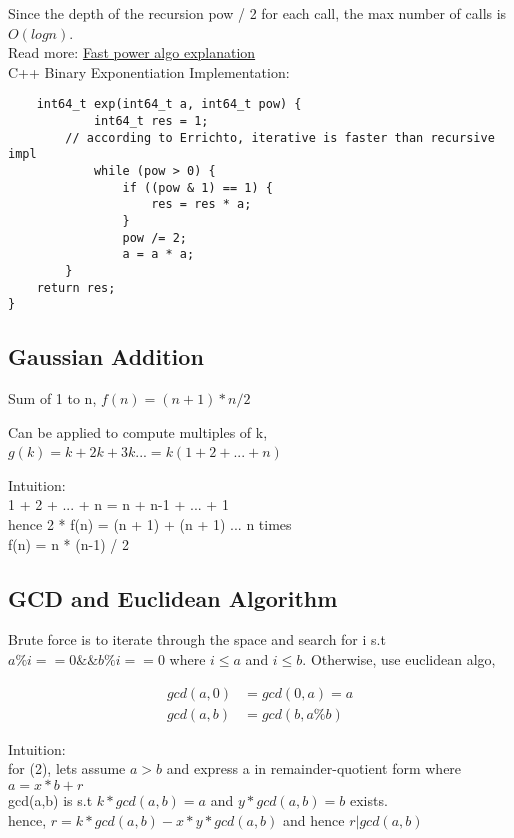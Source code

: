 \documentclass[12pt]{article}
\begin{document}
Since the depth of the recursion pow / 2 for each call, the max number of calls is \(O(log n)\). \\ [\baselineskip]

\noindent Read more: \href{https://www.rookieslab.com/posts/fast-power-algorithm-exponentiation-by-squaring-cpp-python-implementation}{Fast power algo explanation} \\ [\baselineskip]

\noindent C++ Binary Exponentiation Implementation:
\begin{verbatim}
	int64_t exp(int64_t a, int64_t pow) {
    		int64_t res = 1; 
		// according to Errichto, iterative is faster than recursive impl
    		while (pow > 0) {
        		if ((pow & 1) == 1) {
            		res = res * a; 
        		} 
        		pow /= 2; 
        		a = a * a; 
    	}
    return res; 
} 
\end{verbatim} 

\subsection{Gaussian Addition} 
Sum of 1 to n, \( f(n) = (n + 1) * n / 2 \)

\noindent Can be applied to compute multiples of k, \( g(k) = k + 2k + 3k ... = k(1 + 2 + ... + n) \)\

Intuition: \\ 

1 + 2 + ... + n = n + n-1 + ... + 1 \\
hence 2 * f(n) = (n + 1) + (n + 1) ... n times \\ 
f(n) = n * (n-1) / 2 

\subsection{GCD and Euclidean Algorithm} 

Brute force is to iterate through the space and search for i s.t \(a \% i == 0 \&\& b \% i == 0\) where \(i \leq a\) and \(i \leq b\). Otherwise, use euclidean algo, 

\begin{align}  
	gcd(a, 0) &= gcd(0, a) = a \tag{base case} \\
	gcd(a, b) &= gcd(b, a \% b) \tag{recursive case}
\end{align}

Intuition: \\

for (2), lets assume \(a > b\) and express a in remainder-quotient form where \(a = x * b + r \) \\ 
gcd(a,b) is s.t \(k * gcd(a, b) = a\) and \(y * gcd(a,b) = b\) exists. \\
hence, \(r = k * gcd(a, b) - x* y * gcd(a, b)\) and hence \(r | gcd(a, b)\)
\end{document}
